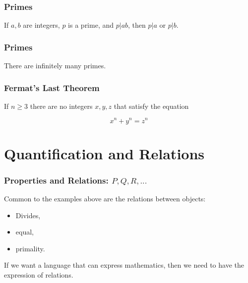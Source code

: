 \documentclass{beamer}
\begin{document}
\begin{frame}
	\frametitle{Primes}
	
	If $a,b$ are integers, $p$ is a prime, and $p|ab$, then $p|a$ or $p|b$. 
	
	\vspace{7cm}
\end{frame}

\begin{frame}
	\frametitle{Primes}
	
	There are infinitely many primes. 
	
	\vspace{7cm}
	
\end{frame}

\begin{frame}
	\frametitle{Fermat's Last Theorem}
	
	If $n \geq 3$ there are no integers $x,y,z$ that satisfy the equation 
	
	$$ x^{n} + y^{n} = z^{n}$$
	
	\vspace{7cm}
	
\end{frame}

\section{Quantification and Relations}

\begin{frame}
\frametitle{Properties and Relations: $P,Q,R,...$}
	
	Common to the examples above are the relations between objects: 
	
	\vspace{0.5cm}
	
	\begin{itemize}
		\item Divides, 
		\item equal,
		\item primality.
	\end{itemize}

	\vspace{0.5cm}
	
	If we want a language that can express mathematics, then we need to have the expression of relations. 
	
	
\end{frame}
\end{document}
